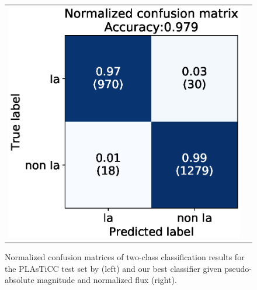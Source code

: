 \documentclass[proof]{pasj01}
\begin{document}
\begin{figure}[htbp]
\begin{tabular}{cc}
\begin{minipage}{0.5\hsize}
\begin{center}
                \includegraphics[width=\columnwidth]{figures/03_CM_abs-mag_scaled-flux_w-mixup_predictions_test_2.eps}
            \end{center}
        \end{minipage}
    \end{tabular}  \caption{%
    Normalized confusion matrices of two-class classification results for the PLAsTiCC test set by \citet{boone19a} (left) and our best classifier given pseudo-absolute magnitude and normalized flux (right).
    }%
    \label{fig:comp_plasticc_1st}
\end{figure}
%
%
%
%
\end{document}
